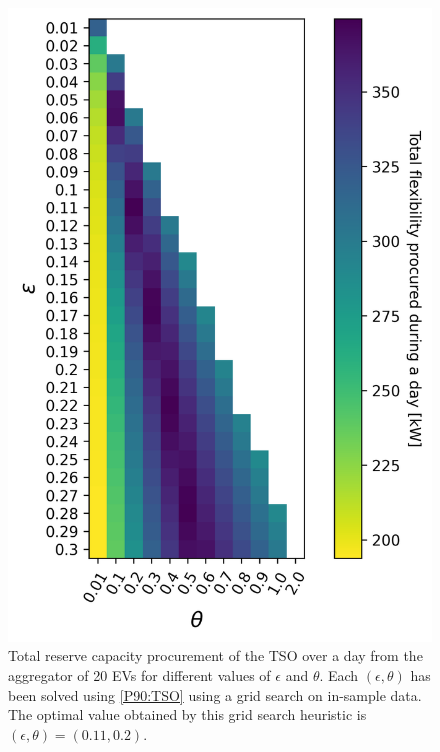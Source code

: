 \documentclass[conference]{IEEEtran}
\begin{document}
\begin{figure}[!t]
    \centering
    \includegraphics[width=0.95\columnwidth]{../figures/heatmap.png}
    \caption{\small{Total reserve capacity procurement of the \ac{TSO} over a day from the aggregator of 20 EVs for different values of $\epsilon$ and $\theta$. Each $(\epsilon, \theta)$ has been solved using \eqref{P90:TSO} using a grid search on in-sample data. The optimal value obtained by this grid search heuristic is $(\epsilon, \theta) = (0.11, 0.2)$. \vspace{-2mm}}}
    \label{fig:tso}
\end{figure}


\vspace{2mm}
\end{document}
